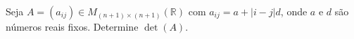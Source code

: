 Seja \(A=(a_{ij})\in M_{(n+1)\times (n+1)}(\mathbb{R})\) com \(a_{ij}=a+|i-j|d\), onde \(a\) e \(d\) são números reais fixos. Determine \(\det(A)\).
